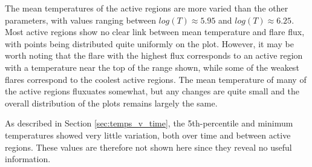\documentclass[referee,a4paper,12pt]{swsc}
\begin{document}
\begin{linenumbers}
The mean temperatures of the active regions are more varied than the other parameters, with values ranging between $log(T) \approx 5.95$ and $log(T) \approx 6.25$. 
Most active regions show no clear link between mean temperature and flare flux, with points being distributed quite uniformly on the plot.
However, it may be worth noting that the flare with the highest flux corresponds to an active region with a temperature near the top of the range shown, while some of the weakest flares correspond to the coolest active regions.
The mean temperature of many of the active regions fluxuates somewhat, but any changes are quite small and the overall distribution of the plots remains largely the same.

As described in Section \ref{sec:temps_v_time}, the 5th-percentile and minimum temperatures showed very little variation, both over time and between active regions.
These values are therefore not shown here since they reveal no useful information.


\end{linenumbers}
\end{document}
